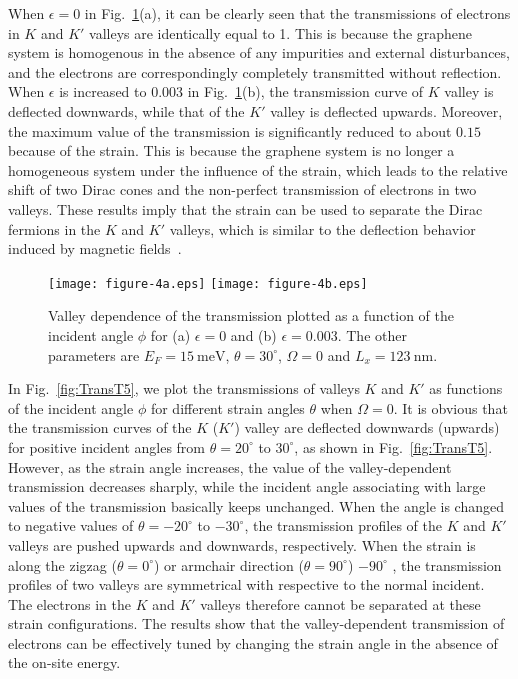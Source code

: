 \documentclass[reprint,amsmath,amssymb,aps,superscriptaddress]{revtex4-2}
\begin{document}
When $\epsilon=0$ in Fig.~\ref{fig:TransT4}(a), it can be clearly seen that the transmissions of electrons in $K$ and $K'$ valleys are identically equal to 1. This is because the graphene system is homogenous in the absence of any impurities and external disturbances, and the electrons are correspondingly completely transmitted without reflection. When $\epsilon$ is increased to 0.003 in Fig.~\ref{fig:TransT4}(b), the transmission curve of $K$ valley is deflected downwards, while that of the $K'$ valley is deflected upwards. Moreover, the maximum value of the transmission is significantly reduced to about $0.15$ because of the strain. This is because the graphene system is no longer a homogeneous system under the influence of the strain, which leads to the relative shift of two Dirac cones and the non-perfect transmission of electrons in two valleys. These results imply that the strain can be used to separate the Dirac fermions in the $K$ and $K'$ valleys, which is similar to the deflection behavior induced by magnetic fields~\cite{Martino,Masir,Li3}.
\begin{figure}[b]
	\centering
	\texttt{[image: figure-4a.eps]}%
	\texttt{[image: figure-4b.eps]}%
	\caption{\label{fig:TransT4} Valley dependence of the transmission plotted as a function of the incident angle $\phi$ for (a) $\epsilon=0$ and (b) $\epsilon=0.003$. The other parameters are $E_F=15\ \mathrm{meV}$, $\theta=30^\circ$, $\Omega=0$ and $L_{x}=123\ \mathrm{nm}$.}
\end{figure}

In Fig.~\ref{fig:TransT5}, we plot the transmissions of valleys $K$ and $K'$ as functions of the incident angle $\phi$ for different strain angles $\theta$ when $\Omega=0$. It is obvious that the transmission curves of the $K$ ($K'$) valley are deflected downwards (upwards) for positive incident angles from  $\theta=20^\circ$ to $30^\circ$,
as shown in Fig.~\ref{fig:TransT5}. However, as the strain angle increases, the value of the valley-dependent transmission decreases sharply, while the incident angle associating with large values of the transmission basically keeps unchanged. When the angle is changed to negative values of $\theta=-20^\circ$ to $-30^\circ$, the transmission profiles of the $K$ and $K'$ valleys are pushed upwards and downwards, respectively. When the strain is along the zigzag ($\theta=0^\circ$) or armchair direction ($\theta=90^\circ$) $-90^\circ$ , the transmission profiles of two valleys are symmetrical with respective to the normal incident. The electrons in the $K$ and $K'$ valleys therefore cannot be separated at these strain configurations. The results show that the valley-dependent transmission of electrons can be effectively tuned by changing the strain angle in the absence of the on-site energy.
\end{document}
